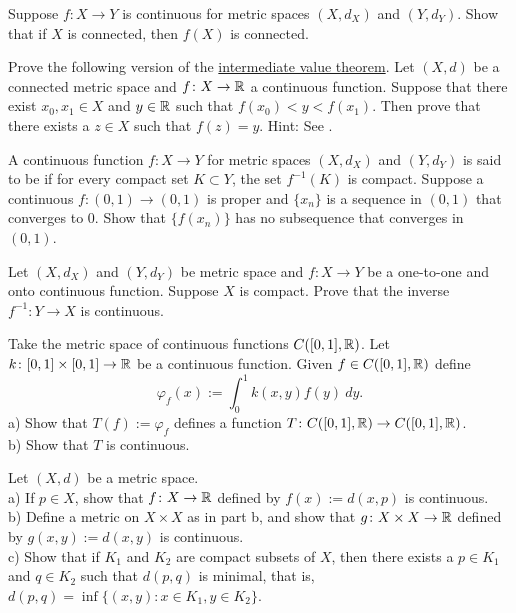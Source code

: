 \begin{exercise} \label{exercise:msconnconn}
Suppose $f \colon X \to Y$ is continuous for metric spaces $(X,d_X)$
and $(Y,d_Y)$.  Show that if $X$ is connected, then $f(X)$ is connected.
\end{exercise}

\begin{exercise}
Prove the following version of the
\hyperref[IVT:thm]{intermediate value theorem}.  Let $(X,d)$ be a connected
metric space and $f \colon X \to {\mathbb{R}}$ a continuous function.  Suppose that
there exist $x_0,x_1 \in X$ and $y \in {\mathbb{R}}$ such that $f(x_0) < y < f(x_1)$.
Then prove that there exists a $z \in X$ such that $f(z) = y$.
Hint: See .
\end{exercise}

\begin{exercise}
A continuous function $f \colon X \to Y$ for metric spaces $(X,d_X)$ and
$(Y,d_Y)$ is said to be \emph{}
if for every compact set $K \subset Y$, the set $f^{-1}(K)$ is compact.
Suppose a continuous $f \colon (0,1) \to (0,1)$ is proper and $\{ x_n
\}$ is a sequence in $(0,1)$ that converges to $0$.  Show that
$\{ f(x_n) \}$ has no subsequence that converges in $(0,1)$.
\end{exercise}

\begin{exercise}
Let $(X,d_X)$ and $(Y,d_Y)$ be metric space and
$f \colon X \to Y$ be a one-to-one and onto continuous function.  Suppose
$X$ is compact.  Prove that the inverse $f^{-1} \colon Y \to X$
is continuous.
\end{exercise}

\begin{exercise}
Take the metric space of continuous functions $C([0,1],{\mathbb{R}})$.  Let
$k \colon [0,1] \times [0,1] \to {\mathbb{R}}$ be a continuous function.
Given $f \in C([0,1],{\mathbb{R}})$ define
\begin{equation*}
\varphi_f(x) := \int_0^1 k(x,y) f(y) ~dy .
\end{equation*}
a) Show that $T(f) := \varphi_f$ defines a function $T \colon C([0,1],{\mathbb{R}}) \to
C([0,1],{\mathbb{R}})$.
\\
b) Show that $T$ is continuous.
\end{exercise}

\begin{exercise}
Let $(X,d)$ be a metric space.\\
a) If $p \in X$,
show that $f \colon X \to {\mathbb{R}}$ defined
by $f(x) := d(x,p)$ is continuous.
\\
b) Define a metric on $X \times X$ as in  part
b, and show that $g \colon X \times X \to {\mathbb{R}}$ defined by
$g(x,y) := d(x,y)$ is continuous.
\\
c) Show that if $K_1$ and $K_2$ are compact subsets of $X$, then
there exists a $p \in K_1$ and $q \in K_2$ such that $d(p,q)$ is minimal,
that is, $d(p,q) = \inf \{ (x,y) \colon x \in K_1, y \in K_2 \}$.
\end{exercise}

